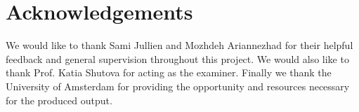 \documentclass[11pt]{article}
\begin{document}
\section{Acknowledgements}

We would like to thank Sami Jullien and Mozhdeh Ariannezhad for their helpful feedback and general
supervision throughout this project. We would also like to thank Prof. Katia Shutova for acting as
the examiner. Finally we thank the University of Amsterdam for providing the opportunity and
resources necessary for the produced output.


\end{document}
